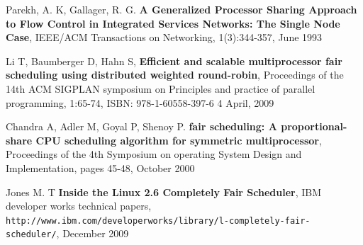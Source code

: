 \documentclass[11pt]{article}
\begin{document}
\begin{thebibliography}{9}
	Parekh, A. K, Gallager, R. G.
	\textbf{A Generalized Processor Sharing Approach to Flow Control in Integrated Services Networks: The Single Node Case},
	IEEE/ACM Transactions on Networking,	
	1(3):344-357,
	June 1993
	
	Li T, Baumberger D, Hahn S,
	\textbf{Efficient and scalable multiprocessor fair scheduling using distributed weighted round-robin},
	Proceedings of the 14th ACM SIGPLAN symposium on Principles and practice of parallel programming,
	1:65-74, ISBN: 978-1-60558-397-6
	4 April, 2009

 	Chandra A, Adler M, Goyal P, Shenoy P.
 	\textbf{fair scheduling: A proportional-share CPU scheduling algorithm for symmetric multiprocessor},
 	Proceedings of the 4th Symposium on operating System Design and Implementation,
 	pages 45-48,
 	October 2000
	
	Jones M. T
	\textbf{Inside the Linux 2.6 Completely Fair Scheduler},
	IBM developer works technical papers,
	\texttt{http://www.ibm.com/developerworks/library/l-completely-fair-scheduler/},
	December 2009
	
\end{thebibliography}
\end{document}
